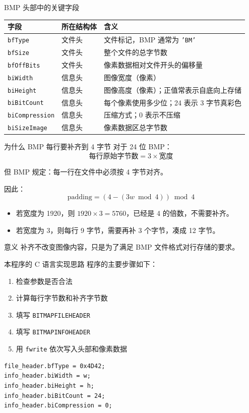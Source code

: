 \documentclass[aspectratio=169,11pt]{beamer}
\begin{document}
\begin{frame}{BMP 头部中的关键字段}
\small
\begin{tabular}{>{\raggedright\arraybackslash}p{2.7cm} >{\raggedright\arraybackslash}p{2.4cm} >{\raggedright\arraybackslash}p{5.6cm}}
\toprule
字段 & 所在结构体 & 含义 \\
\midrule
\texttt{bfType} & 文件头 & 文件标记，BMP 通常为 \texttt{'BM'} \\
\texttt{bfSize} & 文件头 & 整个文件的总字节数 \\
\texttt{bfOffBits} & 文件头 & 像素数据相对文件开头的偏移量 \\
\texttt{biWidth} & 信息头 & 图像宽度（像素） \\
\texttt{biHeight} & 信息头 & 图像高度（像素）；正值常表示自底向上存储 \\
\texttt{biBitCount} & 信息头 & 每个像素使用多少位；24 表示 3 字节真彩色 \\
\texttt{biCompression} & 信息头 & 压缩方式；0 表示不压缩 \\
\texttt{biSizeImage} & 信息头 & 像素数据区总字节数 \\
\bottomrule
\end{tabular}
\end{frame}

\begin{frame}{为什么 BMP 每行要补齐到 4 字节}
对于 24 位 BMP：
\[
\text{每行原始字节数} = 3 \times \text{宽度}
\]

但 BMP 规定：\alert{每一行在文件中必须按 4 字节对齐}。

因此：
\[
\text{padding} = (4 - (3w \bmod 4)) \bmod 4
\]

\begin{itemize}
  \item 若宽度为 1920，则 $1920\times 3 = 5760$，已经是 4 的倍数，不需要补齐。
  \item 若宽度为 3，则每行 9 字节，需要再补 3 个字节，凑成 12 字节。
\end{itemize}

\begin{block}{意义}
补齐不改变图像内容，只是为了满足 BMP 文件格式对行存储的要求。
\end{block}
\end{frame}

\begin{frame}[fragile]{本程序的 C 语言实现思路}
程序的主要步骤如下：
\begin{enumerate}
  \item 检查参数是否合法
  \item 计算每行字节数和补齐字节数
  \item 填写 \texttt{BITMAPFILEHEADER}
  \item 填写 \texttt{BITMAPINFOHEADER}
  \item 用 \texttt{fwrite} 依次写入头部和像素数据
\end{enumerate}

\begin{lstlisting}
file_header.bfType = 0x4D42;
info_header.biWidth = w;
info_header.biHeight = h;
info_header.biBitCount = 24;
info_header.biCompression = 0;
\end{lstlisting}
\end{frame}
\end{document}
